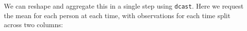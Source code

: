 \documentclass[]{article}
\newenvironment{Shaded}{\begin{snugshade}}{\end{snugshade}}
\newcommand{\KeywordTok}[1]{\textcolor[rgb]{0.13,0.29,0.53}{\textbf{#1}}}
\newcommand{\DataTypeTok}[1]{\textcolor[rgb]{0.13,0.29,0.53}{#1}}
\newcommand{\StringTok}[1]{\textcolor[rgb]{0.31,0.60,0.02}{#1}}
\newcommand{\OperatorTok}[1]{\textcolor[rgb]{0.81,0.36,0.00}{\textbf{#1}}}
\newcommand{\NormalTok}[1]{#1}
\theoremstyle{definition}
\theoremstyle{definition}
\theoremstyle{definition}
\theoremstyle{remark}
\begin{document}
We can reshape and aggregate this in a single step using \texttt{dcast}.
Here we request the mean for each person at each time, with observations
for each time split across two columns:

\begin{Shaded}
\end{Shaded}
\end{document}
